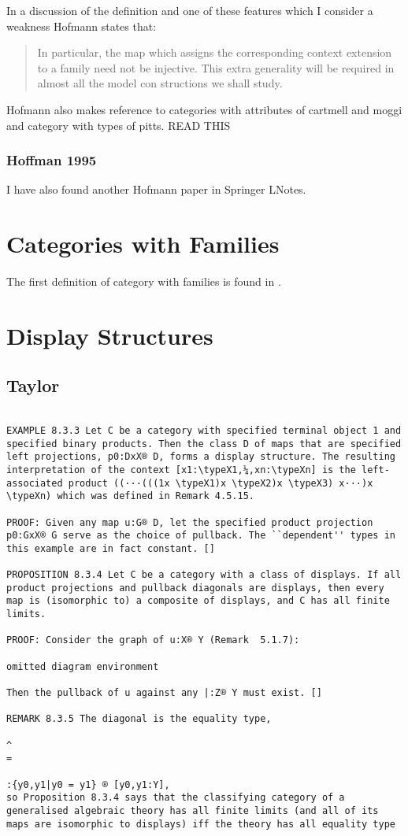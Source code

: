 \documentclass[14pt,a4paper]{scrartcl}
\begin{document}
\noindent
In a discussion of the definition and one of these features which I consider a weakness Hofmann states that:
\begin{quote}
In particular, 
the map which assigns the corresponding context extension to a family need not 
be injective. This extra generality will be required in almost all the model con­ 
structions we shall study. 
\end{quote}

Hofmann also makes reference to categories with attributes of cartmell and moggi and category with types of pitts.
READ THIS 

\subsubsection{Hoffman 1995}
I have also found another Hofmann paper \cite{hofmann95} in Springer LNotes.

\section{Categories with Families}

The first definition of category with families is found in \cite{dybjer96}.

\section{Display Structures}
\subsection{Taylor}
\begin{verbatim}

EXAMPLE 8.3.3 Let C be a category with specified terminal object 1 and specified binary products. Then the class D of maps that are specified left projections, p0:DxX® D, forms a display structure. The resulting interpretation of the context [x1:\typeX1,¼,xn:\typeXn] is the left-associated product ((···(((1x \typeX1)x \typeX2)x \typeX3) x···)x \typeXn) which was defined in Remark 4.5.15.

PROOF: Given any map u:G® D, let the specified product projection p0:GxX® G serve as the choice of pullback. The ``dependent'' types in this example are in fact constant. []

PROPOSITION 8.3.4 Let C be a category with a class of displays. If all product projections and pullback diagonals are displays, then every map is (isomorphic to) a composite of displays, and C has all finite limits.

PROOF: Consider the graph of u:X® Y (Remark  5.1.7):

omitted diagram environment

Then the pullback of u against any |:Z® Y must exist. []

REMARK 8.3.5 The diagonal is the equality type,

^
= 
 
:{y0,y1|y0 = y1} ® [y0,y1:Y],
so Proposition 8.3.4 says that the classifying category of a generalised algebraic theory has all finite limits (and all of its maps are isomorphic to displays) iff the theory has all equality type
\end{verbatim}
  

\end{document}
